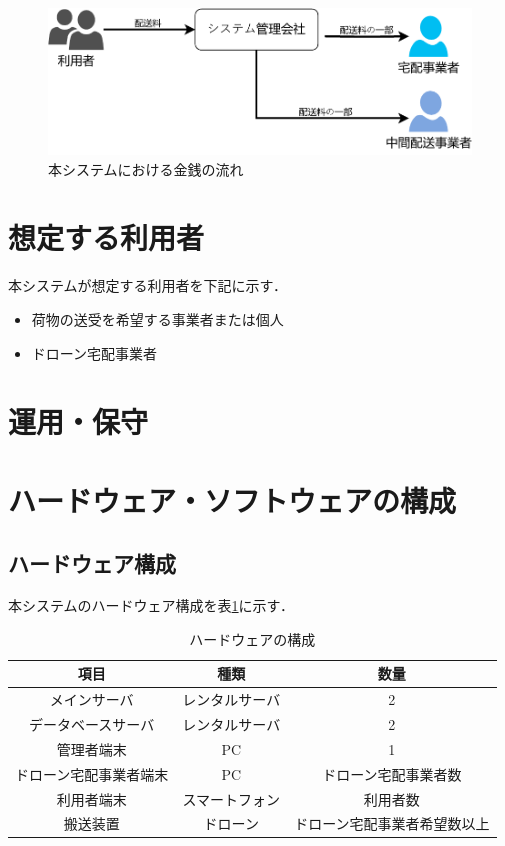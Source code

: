 \documentclass[a4paper, titlepage]{jsarticle}
\begin{document}
\begin{figure}[H]
        \centering
        \includegraphics[width=0.6\linewidth]{./money_flow.pdf}
        \caption{本システムにおける金銭の流れ}
        \label{fig:money_flow_1}
\end{figure}


\section{想定する利用者}
本システムが想定する利用者を下記に示す．
\begin{itemize}
        \item 荷物の送受を希望する事業者または個人
        \item ドローン宅配事業者
\end{itemize}

\section{運用・保守}

\section{ハードウェア・ソフトウェアの構成}
\subsection{ハードウェア構成}
本システムのハードウェア構成を表\ref{fig:hardware}に示す．
\begin{table}[H]
        \begin{center}
                \caption{ハードウェアの構成}
                \label{fig:hardware}
                \begin{tabular}{ccc} \hline
                        項目          & 種類      & 数量             \\ \hline \hline
                        メインサーバ      & レンタルサーバ & 2              \\
                        データベースサーバ   & レンタルサーバ & 2              \\
                        管理者端末       & PC      & 1              \\
                        ドローン宅配事業者端末 & PC      & ドローン宅配事業者数     \\
                        利用者端末       & スマートフォン & 利用者数           \\
                        搬送装置        & ドローン    & ドローン宅配事業者希望数以上 \\ \hline
                \end{tabular}
        \end{center}
\end{table}
\end{document}
